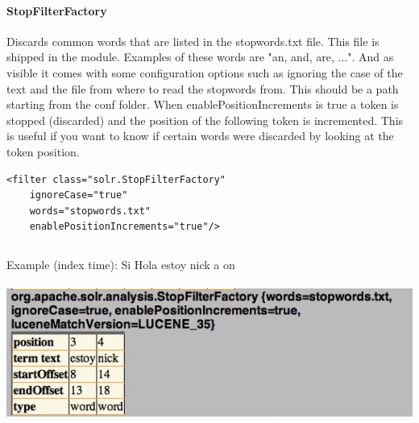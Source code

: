 \paragraph{StopFilterFactory} Discards common words that are listed in the stopwords.txt file. This file is shipped in the module. Examples of these words are "an, and, are, ...". And as visible it comes with some configuration options such as ignoring the case of the text and the file from where to read the stopwords from. This should be a path starting from the conf folder.  When enablePositionIncrements is true a token is stopped (discarded) and the position of the following token is incremented. This is useful if you want to know if certain words were discarded by looking at the token position.
\begin{verbatim}
<filter class="solr.StopFilterFactory"
    ignoreCase="true"
    words="stopwords.txt"
    enablePositionIncrements="true"/>
\end{verbatim}
\inputminted[fontsize=\scriptsize,linenos]{xml}{./code_examples/stopwords.txt}
Example (index time): Si Hola estoy nick a on
\mbox{} \\
\mbox{} \\
\includegraphics[width=\textwidth]{images/stopfilterfactory.jpg}

